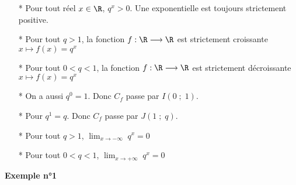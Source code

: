 \begin{itemize}
\item[*] Pour tout réel $x \in \R$, $q^x > 0$. Une exponentielle est toujours strictement positive. 
\item[*] Pour tout $q > 1$, la fonction $f: \R \longrightarrow \R$ est strictement croissante \\
\hspace*{4.8cm} $x \longmapsto f(x) = q^x$ 
\item[*] Pour tout $0 < q < 1$, la fonction $f: \R \longrightarrow \R$ est strictement décroissante \\
\hspace*{5.3cm} $x \longmapsto f(x) = q^x$ 
\item[*] On a aussi $q^0 = 1$. Donc $C_f$ passe par $I\left(0 \; ; \; 1\right)$.
\item[*] Pour $q^1 = q$. Donc $C_f$ passe par $J\left(1 \; ; \; q\right)$.
\item[*] Pour tout $q > 1$, $ \displaystyle {\lim_{x \rightarrow -\infty}} \; q^x = 0$
\item[*] Pour tout $0 < q < 1$, $ \displaystyle {\lim_{x \rightarrow +\infty}} \; q^x = 0$
\end{itemize}

\newpage

\textbf{Exemple n°1} \\

